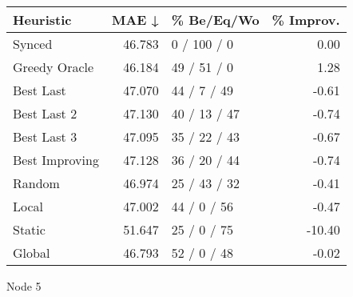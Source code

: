 \begin{tabular}{lrlr}
\toprule
\textbf{Heuristic} & \textbf{MAE ↓} & \textbf{\% Be/Eq/Wo} & \textbf{\% Improv.} \\
\midrule
            Synced &         46.783 &          0 / 100 / 0 &                0.00 \\
     Greedy Oracle &         46.184 &          49 / 51 / 0 &                1.28 \\
         Best Last &         47.070 &          44 / 7 / 49 &               -0.61 \\
       Best Last 2 &         47.130 &         40 / 13 / 47 &               -0.74 \\
       Best Last 3 &         47.095 &         35 / 22 / 43 &               -0.67 \\
    Best Improving &         47.128 &         36 / 20 / 44 &               -0.74 \\
            Random &         46.974 &         25 / 43 / 32 &               -0.41 \\
             Local &         47.002 &          44 / 0 / 56 &               -0.47 \\
            Static &         51.647 &          25 / 0 / 75 &              -10.40 \\
            Global &         46.793 &          52 / 0 / 48 &               -0.02 \\
\bottomrule
\end{tabular}
\caption{Node 5}
\label{tab:iid_lr05_le2_bs4_5}
